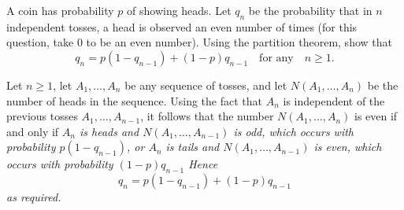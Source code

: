 \begin{exercise}
\begin{questions}

\question
A coin has probability $p$ of showing heads. Let $q_n$ be the probability that in $n$ independent tosses, a head is observed an even number of times (for this question, take $0$ to be an even number). Using the partition theorem, show that 
\[
q_n = p(1-q_{n-1}) + (1-p)q_{n-1}\quad\text{for any}\quad n\geq 1.
\]
\begin{answer}
Let $n\geq 1$, let $A_1,\ldots,A_n$ be any sequence of tosses, and let $N(A_1,\ldots,A_n)$ be the number of heads in the sequence. Using the fact that $A_n$ is independent of the previous tosses $A_1,\ldots,A_{n-1}$, it follows that the number $N(A_1,\ldots,A_n)$ is even if and only if
\bit
\it $A_n$ is heads and $N(A_1,\ldots,A_{n-1})$ is odd, which occurs with probability $p(1-q_{n-1})$, or
\it $A_n$ is tails and $N(A_1,\ldots,A_{n-1})$ is even, which occurs with probability $(1-p)q_{n-1}$
\eit
Hence
\[
q_n = p(1-q_{n-1}) + (1-p)q_{n-1}
\]
as required.
\end{answer}

\end{questions}
\end{exercise}

\endinput
